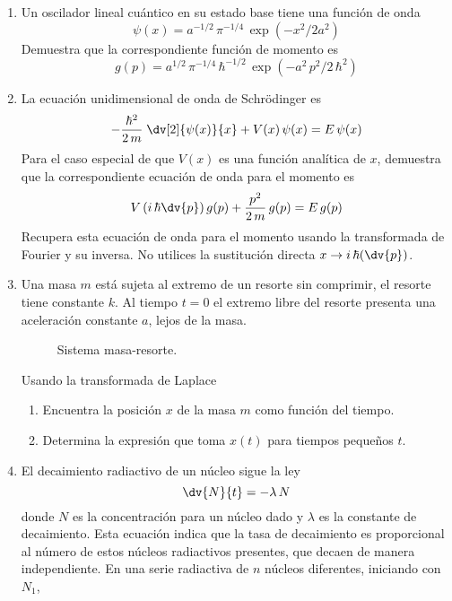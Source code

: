 \begin{enumerate}
\item Un oscilador lineal cuántico en su estado base tiene una función de onda
\[ \psi(x) = a^{-1/2} \, \pi^{-1/4} \, \exp(-x^{2}/2a^{2}) \]
Demuestra que la correspondiente función de momento es
\[ g(p) = a^{1/2} \, \pi^{-1/4} \, \hbar^{-1/2} \, \exp(-a^{2} \, p^{2}/2 \, \hbar^{2}) \]
\item La ecuación unidimensional de onda de Schrödinger es
\[ - \dfrac{\hbar^{2}}{2 \, m} \; \dv[2]{\psi(x)}{x} +  V(x) \, \psi(x) = E \, \psi (x) \]
Para el caso especial de que $V(x)$ es una función analítica de $x$, demuestra que la correspondiente ecuación de onda para el momento es
\[ V \left( i \, \hbar \dv{p} \right) g(p) + \dfrac{p^{2}}{2 \, m} \, g(p) =  E \, g(p)  \]
Recupera esta ecuación de onda para el momento usando la transformada de Fourier y su inversa. No utilices la sustitución directa $\displaystyle{x \to i \, \hbar (\dv{p})}$.
\item Una masa $m$ está sujeta al extremo de un resorte sin comprimir, el resorte tiene constante $k$. Al tiempo $t=0$ el extremo libre del resorte presenta una aceleración constante $a$, lejos de la masa. 
\begin{figure}[H]
\centering

\caption{Sistema masa-resorte.}
\label{fig:figura1}
\end{figure}
Usando la transformada de Laplace
\begin{enumerate}[label=\alph*)]
\item Encuentra la posición $x$ de la masa $m$ como función del tiempo.
\item Determina la expresión que toma $x(t)$ para tiempos pequeños $t$.
\end{enumerate}
\item El decaimiento radiactivo de un núcleo sigue la ley
\[ \dv{N}{t} = - \lambda \, N \]
donde $N$ es la concentración para un núcleo dado y $\lambda$ es la constante de decaimiento. Esta ecuación indica que la tasa de decaimiento es proporcional al número de estos núcleos radiactivos presentes, que decaen de manera independiente. En una serie radiactiva de $n$ núcleos diferentes, iniciando con $N_{1}$,

\end{enumerate}
